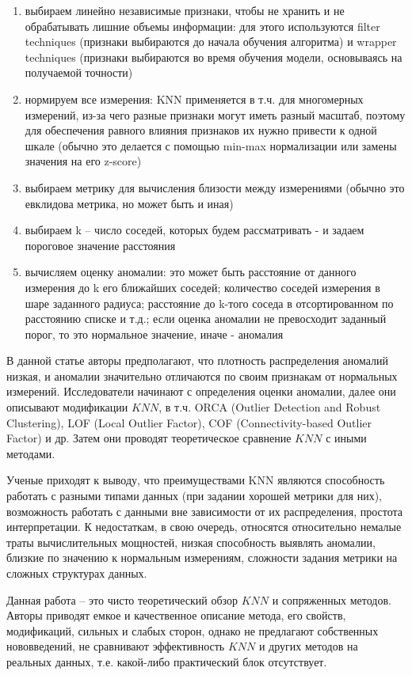 \documentclass[14pt, letterpaper]{extarticle}
\begin{document}
\begin{enumerate}
    \item выбираем линейно независимые признаки, чтобы не хранить и не обрабатывать лишние объемы информации: для этого используются filter techniques (признаки выбираются до начала обучения алгоритма) и wrapper techniques (признаки выбираются во время обучения модели, основываясь на получаемой точности)
    \item нормируем все измерения: KNN применяется в т.ч. для многомерных измерений, из-за чего разные признаки могут иметь разный масштаб, поэтому для обеспечения равного влияния признаков их нужно привести к одной шкале (обычно это делается с помощью min-max нормализации или замены значения на его z-score)
    \item выбираем метрику для вычисления близости между измерениями (обычно это евклидова метрика, но может быть и иная)
    \item выбираем k – число соседей, которых будем рассматривать - и задаем пороговое значение расстояния
    \item вычисляем оценку аномалии: это может быть расстояние от данного измерения до k его ближайших соседей; количество соседей измерения в шаре заданного радиуса; расстояние до k-того соседа в отсортированном по расстоянию списке и т.д.; если оценка аномалии не превосходит заданный порог, то это нормальное значение, иначе - аномалия
\end{enumerate}

В данной статье авторы предполагают, что плотность распределения аномалий низкая, и аномалии значительно отличаются по своим признакам от нормальных измерений. Исследователи начинают с определения оценки аномалии, далее они описывают модификации $KNN$, в т.ч. ORCA (Outlier Detection and Robust Clustering), LOF (Local Outlier Factor), COF (Connectivity-based Outlier Factor) и др. Затем они проводят теоретическое сравнение $KNN$ с иными методами. 

Ученые приходят к выводу, что преимуществами KNN являются способность работать с разными типами данных (при задании хорошей метрики для них), возможность работать с данными вне зависимости от их распределения, простота интерпретации. К недостаткам, в свою очередь, относятся относительно немалые траты вычислительных мощностей, низкая способность выявлять аномалии, близкие по значению к нормальным измерениям, сложности задания метрики на сложных структурах данных. 

Данная работа – это чисто теоретический обзор $KNN$ и сопряженных методов. Авторы приводят емкое и качественное описание метода, его свойств, модификаций, сильных и слабых сторон, однако не предлагают собственных нововведений, не сравнивают эффективность $KNN$ и других методов на реальных данных, т.е. какой-либо практический блок отсутствует.
\end{document}
